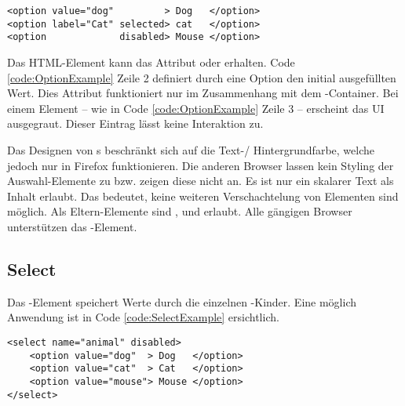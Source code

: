 \begin{lstlisting}[style = htmlcssjs, caption = Option Beispiel, label = code:OptionExample]
<option value="dog"         > Dog   </option>
<option label="Cat" selected> cat   </option>
<option             disabled> Mouse </option>
\end{lstlisting}    

Das HTML-Element kann das Attribut  oder  erhalten.
Code \ref{code:OptionExample} Zeile 2 definiert durch eine  Option den initial ausgefüllten Wert.
Dies Attribut funktioniert nur im Zusammenhang mit dem -Container. 
Bei einem  Element – wie in Code \ref{code:OptionExample} Zeile 3 – erscheint das UI ausgegraut.
Dieser Eintrag lässt keine Interaktion zu.

Das Designen von s beschränkt sich auf die Text-/ Hintergrundfarbe, welche jedoch nur in Firefox funktionieren. 
Die anderen Browser lassen kein Styling der Auswahl-Elemente zu bzw. zeigen diese nicht an.
Es ist nur ein skalarer Text als Inhalt erlaubt. 
Das bedeutet, keine weiteren Verschachtelung von Elementen sind möglich.
Als Eltern-Elemente sind ,  und  erlaubt.
Alle gängigen Browser unterstützen das -Element.


\subsection{Select}
\label{sec:select}

Das -Element speichert Werte durch die einzelnen -Kinder.
Eine möglich Anwendung ist in Code \ref{code:SelectExample} ersichtlich.

\begin{lstlisting}[style = htmlcssjs, caption = Disabled Select Beispiel, label = code:SelectExample]
<select name="animal" disabled>
    <option value="dog"  > Dog   </option>
    <option value="cat"  > Cat   </option>
    <option value="mouse"> Mouse </option>
</select>
\end{lstlisting}

